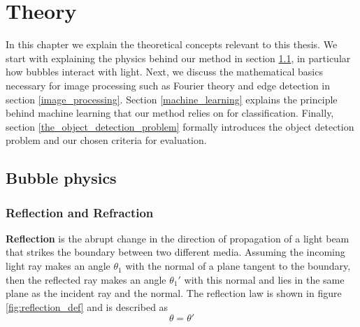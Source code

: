 \chapter{Theory}\label{theory}
In this chapter we explain the theoretical concepts relevant to this thesis. We start with explaining the physics behind our method in section \ref{bubble_physics}, in particular how bubbles interact with light. Next, we discuss the mathematical basics necessary for image processing such as Fourier theory and edge detection in section \ref{image_processing}. Section \ref{machine_learning} explains the principle behind machine learning that our method relies on for classification. Finally, section \ref{the_object_detection_problem} formally introduces the object detection problem and our chosen criteria for evaluation. 

	\section{Bubble physics} \label{bubble_physics}

		\subsection{Reflection and Refraction}
			\textbf{Reflection} is the abrupt change in the direction of propagation of a light beam that strikes the boundary between two different media. Assuming the incoming light ray makes an angle $\theta_1$ with the normal of a plane tangent to the boundary, then the reflected ray makes an angle $\theta_1'$ with this normal and lies in the same plane as the incident ray and the normal. The reflection law is shown in figure \ref{fig:reflection_def} and is described as
			\begin{equation}
				\theta = \theta'
			\end{equation}
			
